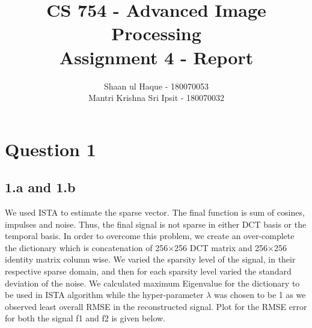 \documentclass[12pt]{article}
\title{CS 754 - Advanced Image Processing\\Assignment 4 - Report}
\author{Shaan ul Haque - 180070053\\Mantri Krishna Sri Ipsit - 180070032}
\begin{document}
	
	\maketitle
	
\section*{Question 1}
\subsection*{1.a and 1.b}
We used ISTA to estimate the sparse vector. The final function is sum of cosines, impulses and noise. Thus, the final signal is not sparse in either DCT basis or the temporal basis. In order to overcome this problem, we create an over-complete the dictionary which is concatenation of 256×256 DCT matrix and 256×256 identity matrix column wise. We varied the sparsity level of the signal, in their respective sparse domain, and then for each sparsity level varied the standard deviation of the noise. We calculated maximum Eigenvalue for the dictionary to be used in ISTA algorithm while the hyper-parameter $\lambda$ was chosen to be 1 as we observed least overall RMSE in the reconstructed signal. Plot for the RMSE error for both the signal f1 and f2 is given below.  
\end{document}
